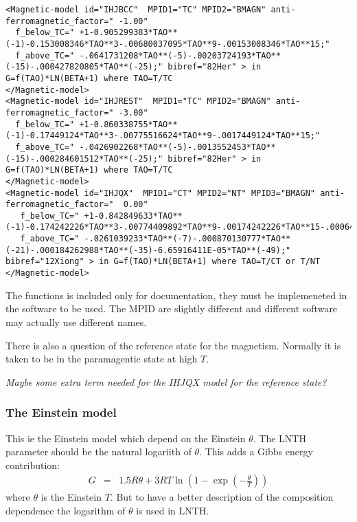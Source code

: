 \documentclass[12pt]{article}
\begin{document}
\begin{appendices}
{\small
\begin{verbatim}
<Magnetic-model id="IHJBCC"  MPID1="TC" MPID2="BMAGN" anti-ferromagnetic_factor=" -1.00" 
  f_below_TC=" +1-0.905299383*TAO**(-1)-0.153008346*TAO**3-.00680037095*TAO**9-.00153008346*TAO**15;"
  f_above_TC=" -.0641731208*TAO**(-5)-.00203724193*TAO**(-15)-.000427820805*TAO**(-25);" bibref="82Her" > in G=f(TAO)*LN(BETA+1) where TAO=T/TC
</Magnetic-model>
<Magnetic-model id="IHJREST"  MPID1="TC" MPID2="BMAGN" anti-ferromagnetic_factor=" -3.00" 
  f_below_TC=" +1-0.860338755*TAO**(-1)-0.17449124*TAO**3-.00775516624*TAO**9-.0017449124*TAO**15;"
  f_above_TC=" -.0426902268*TAO**(-5)-.0013552453*TAO**(-15)-.000284601512*TAO**(-25);" bibref="82Her" > in G=f(TAO)*LN(BETA+1) where TAO=T/TC
</Magnetic-model>
<Magnetic-model id="IHJQX"  MPID1="CT" MPID2="NT" MPID3="BMAGN" anti-ferromagnetic_factor="  0.00" 
   f_below_TC=" +1-0.842849633*TAO**(-1)-0.174242226*TAO**3-.00774409892*TAO**9-.00174242226*TAO**15-.000646538871*TAO**21;"
   f_above_TC=" -.0261039233*TAO**(-7)-.000870130777*TAO**(-21)-.000184262988*TAO**(-35)-6.65916411E-05*TAO**(-49);" bibref="12Xiong" > in G=f(TAO)*LN(BETA+1) where TAO=T/CT or T/NT
</Magnetic-model>
\end{verbatim}
}

The functions is included only for documentation, they must be
implemeneted in the software to be used.  The MPID are slightly
different and different software may actually use different names.

There is also a question of the reference state for the magnetism.
Normally it is taken to be in the paramagentic state at high $T$.

{\em Maybe some extra term needed for the IHJQX model for the
  reference state?}

\subsubsection{The Einstein model}

This ie the Einstein model which depend on the Einstein $\theta$.  The
LNTH parameter should be the natural logariith of $\theta$.  This
adds a Gibbs energy contribution:
\begin{eqnarray}
G &=& 1.5R\theta + 3RT\ln( 1 - \exp(- \frac{\theta}{T})) \label{eq:egein}
\end{eqnarray}
where $\theta$ is the Einstein $T$.  But to have a better description
of the composition dependence the logarithm of $\theta$ is used in LNTH.


\end{appendices}
\end{document}
